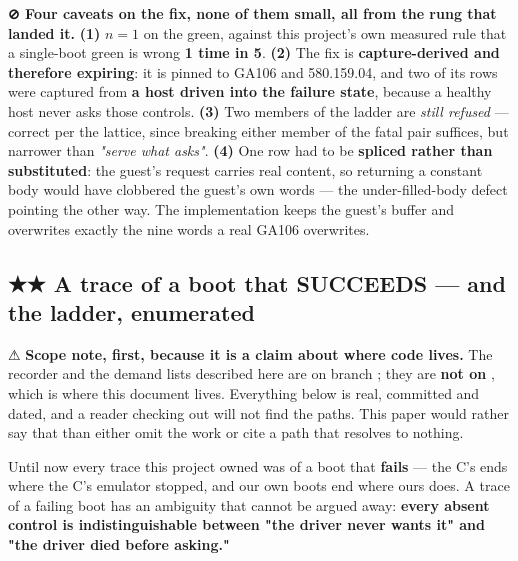 \documentclass[10.5pt]{article}
\begin{document}
\begin{claimbox}\small
\textbf{⊘ Four caveats on the fix, none of them small, all from the rung that landed it.}
\textbf{(1)} \textbf{$n = 1$} on the  green, against this project's own measured
rule that a single-boot green is wrong \textbf{1 time in 5}. \textbf{(2)} The fix is
\textbf{capture-derived and therefore expiring}: it is pinned to GA106 and 580.159.04, and two of
its rows were captured from \textbf{a host driven into the failure state}, because a healthy host
never asks those controls. \textbf{(3)} Two members of the ladder are \emph{still refused} —
correct per the lattice, since breaking either member of the fatal pair suffices, but narrower
than \emph{"serve what  asks"}. \textbf{(4)} One row had to be \textbf{spliced rather
than substituted}: the guest's request carries real content, so returning a constant body would
have clobbered the guest's own words — the under-filled-body defect pointing the other way. The
implementation keeps the guest's buffer and overwrites exactly the nine words a real GA106
overwrites.
\end{claimbox}

\subsection{\texorpdfstring{★★ A trace of a boot that SUCCEEDS --- and the ladder, enumerated}{A trace of a boot that SUCCEEDS --- and the ladder, enumerated}}
\label{sec:recorder}

\begin{claimbox}\small
⚠ \textbf{Scope note, first, because it is a claim about where code lives.} The recorder and the
demand lists described here are on branch ; they are \textbf{not on
}, which is where this document lives. Everything below is real, committed and
dated, and a reader checking out  will not find the paths. This paper would rather
say that than either omit the work or cite a path that resolves to nothing.
\end{claimbox}

Until now every trace this project owned was of a boot that \textbf{fails} — the C's
 ends where the C's emulator stopped, and our own boots end where ours does. A trace
of a failing boot has an ambiguity that cannot be argued away: \textbf{every absent control is
indistinguishable between "the driver never wants it" and "the driver died before asking."}
\end{document}
